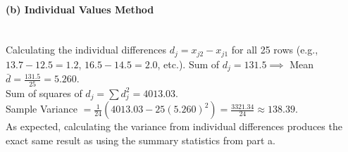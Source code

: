 \documentclass[12pt]{article}
\begin{document}
\paragraph{(b) Individual Values Method} \mbox{} \\
Calculating the individual differences $d_j = x_{j2} - x_{j1}$ for all 25 rows (e.g., $13.7 - 12.5 = 1.2$, $16.5 - 14.5 = 2.0$, etc.).
Sum of $d_j = 131.5 \implies$ Mean $\bar{d} = \frac{131.5}{25} = 5.260$. \\
Sum of squares of $d_j = \sum d_j^2 = 4013.03$. \\
Sample Variance $= \frac{1}{24} \left( 4013.03 - 25(5.260)^2 \right) = \frac{3321.34}{24} \approx 138.39$. \\
As expected, calculating the variance from individual differences produces the exact same result as using the summary statistics from part a.
\end{document}
